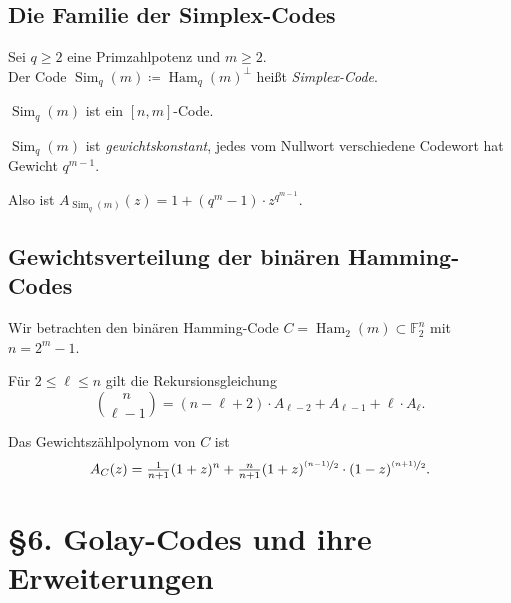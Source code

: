 \documentclass{cheat-sheet}
\newcommand{\F}{\mathbb{F}} %
\DeclareMathOperator{\Ham}{Ham} %
\DeclareMathOperator{\Sim}{Sim} %
\begin{document}
\subsection{Die Familie der Simplex-Codes}

\begin{defn}
  Sei $q \geq 2$ eine Primzahlpotenz und $m \geq 2$. \\
  Der Code $\Sim_q(m) \coloneqq \Ham_q(m)^\perp$ heißt \emph{Simplex-Code}.
\end{defn}

\begin{bem}
  $\Sim_q(m)$ ist ein $[n, m]$-Code.
\end{bem}

\begin{satz}
  $\Sim_q(m)$ ist \emph{gewichtskonstant}, \dh{} jedes vom Nullwort verschiedene Codewort hat Gewicht $q^{m-1}$.
\end{satz}

\begin{samepage}

\begin{bem}
  Also ist $A_{\Sim_q(m)}(z) = 1 + (q^m - 1) \cdot z^{q^{m-1}}$.
\end{bem}

\subsection{Gewichtsverteilung der binären Hamming-Codes}

Wir betrachten den binären Hamming-Code $C = \Ham_2(m) \subset \F_2^n$ mit $n = 2^m - 1$.

\begin{lem}
  Für $2 \leq \ell \leq n$ gilt die Rekursionsgleichung
  \[
    \binom{n}{\ell-1} = (n-\ell+2) \cdot A_{\ell-2} + A_{\ell-1} + \ell \cdot A_\ell.
  \]
\end{lem}

\begin{satz}
  Das Gewichtszählpolynom von $C$ ist
  \[
    A_C(z) = \tfrac{1}{n+1} (1+z)^n + \tfrac{n}{n+1} (1+z)^{\nicefrac{(n-1)}{2}} \cdot (1-z)^{\nicefrac{(n+1)}{2}}.
  \]
\end{satz}


\section{§6. Golay-Codes und ihre Erweiterungen}

\end{samepage}
\end{document}
